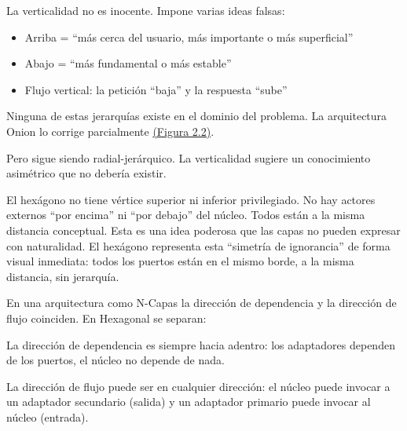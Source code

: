 \documentclass[12pt, a4paper]{article}
\begin{document}
        La verticalidad no es inocente. Impone varias ideas falsas:
        \begin{itemize}
            \item Arriba = ``más cerca del usuario, más importante o más superficial''
            \item Abajo = ``más fundamental o más estable''
            \item Flujo vertical: la petición ``baja'' y la respuesta ``sube''
        \end{itemize}
        Ninguna de estas jerarquías existe en el dominio del problema. La arquitectura Onion lo corrige parcialmente \hyperref[fig:Figura2.2]{(Figura 2.2)}.
        \begin{table}[H]
            \centering
            \caption*{Figura 2.2: Estructura de la arquitectura Onion}
            \label{fig:Figura2.2}
        \end{table}

        Pero sigue siendo radial-jerárquico. La verticalidad sugiere un conocimiento asimétrico que no debería existir.

        El hexágono no tiene vértice superior ni inferior privilegiado. No hay actores externos ``por encima'' ni ``por debajo'' del núcleo. Todos están a la misma distancia conceptual. Esta es una idea poderosa que las capas no pueden expresar con naturalidad. El hexágono representa esta ``simetría de ignorancia'' de forma visual inmediata: todos los puertos están en el mismo borde, a la misma distancia, sin jerarquía.

        En una arquitectura como N-Capas la dirección de dependencia y la dirección de flujo coinciden. En Hexagonal se separan:

        La dirección de dependencia es siempre hacia adentro: los adaptadores dependen de los puertos, el núcleo no depende de nada.

        La dirección de flujo puede ser en cualquier dirección: el núcleo puede invocar a un adaptador secundario (salida) y un adaptador primario puede invocar al núcleo (entrada).
\end{document}
